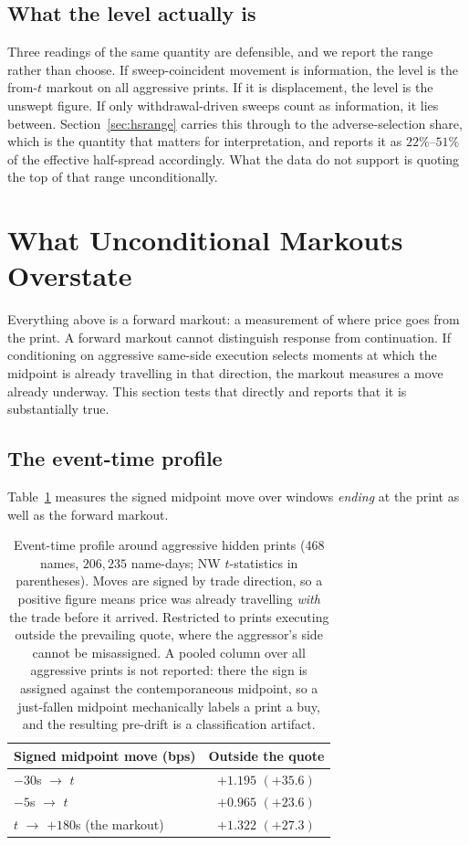 \documentclass[11pt]{article}
\begin{document}
\subsection{What the level actually is}

Three readings of the same quantity are defensible, and we report the range rather than
choose. If sweep-coincident movement is information, the level is the from-$t$ markout on all
aggressive prints. If it is displacement, the level is the unswept figure. If only
withdrawal-driven sweeps count as information, it lies between. Section~\ref{sec:hsrange}
carries this through to the adverse-selection share, which is the quantity that matters for
interpretation, and reports it as $22\%$--$51\%$ of the effective half-spread accordingly.
What the data do not support is quoting the top of that range unconditionally.

\section{What Unconditional Markouts Overstate}
\label{sec:overstate}

Everything above is a forward markout: a measurement of where price goes from the print. A
forward markout cannot distinguish response from continuation. If conditioning on aggressive
same-side execution selects moments at which the midpoint is already travelling in that
direction, the markout measures a move already underway. This section tests that directly
and reports that it is substantially true.

\subsection{The event-time profile}

Table~\ref{tab:preprint} measures the signed midpoint move over windows \emph{ending} at the
print as well as the forward markout.

\begin{table}[htbp]
\centering
\begin{tabular}{lc}
\toprule
\textbf{Signed midpoint move (bps)} & \textbf{Outside the quote} \\
\midrule
$-30$s $\rightarrow$ $t$ & $+1.195$ $(+35.6)$ \\
$-5$s $\rightarrow$ $t$ & $+0.965$ $(+23.6)$ \\
\midrule
$t$ $\rightarrow$ $+180$s (the markout) & $+1.322$ $(+27.3)$ \\
\bottomrule
\end{tabular}
\caption{Event-time profile around aggressive hidden prints (468 names, $206{,}235$
name-days; NW $t$-statistics in parentheses). Moves are signed by trade direction, so a
positive figure means price was already travelling \emph{with} the trade before it arrived.
Restricted to prints executing outside the prevailing quote, where the aggressor's side cannot
be misassigned. A pooled column over all aggressive prints is not reported: there the sign is
assigned against the contemporaneous midpoint, so a just-fallen midpoint mechanically labels a
print a buy, and the resulting pre-drift is a classification artifact.}
\label{tab:preprint}
\end{table}
\end{document}
